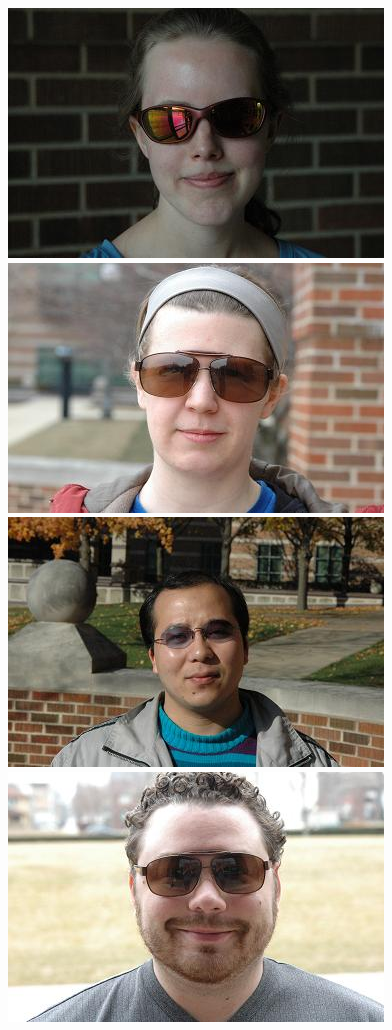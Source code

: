 \documentclass[10pt,journal,letterpaper,compsoc]{IEEEtran} %
\begin{document}
\begin{figure}[t]
\includegraphics[scale=0.75,clip=true]{figures_pami/uiuc_example/sunglasses/DSC_4106.JPG}
\includegraphics[scale=0.75,clip=true]{figures_pami/uiuc_example/sunglasses/DSC_4126.JPG} \\
\vspace{2mm}
\centering
\includegraphics[scale=0.75,clip=true]{figures_pami/uiuc_example/sunglasses_failed/DSC_1611.JPG}
\includegraphics[scale=0.75,clip=true]{figures_pami/uiuc_example/sunglasses_failed/DSC_3528.JPG}

\end{figure}
\end{document}
